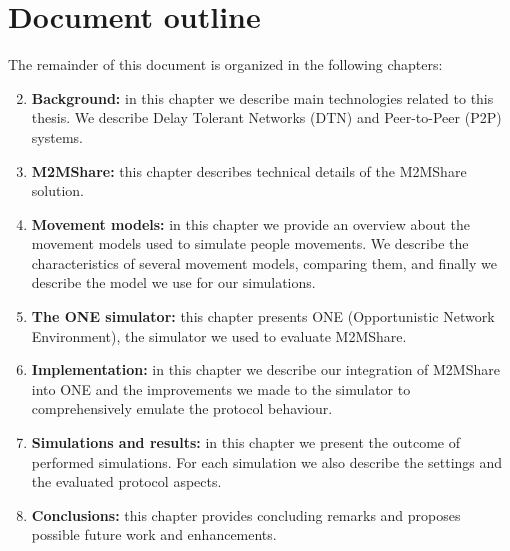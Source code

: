 \section{Document outline}
The remainder of this document is organized in the following chapters:
\begin{enumerate}
\setcounter{enumi}{1}
\item \textbf{Background:} in this chapter we describe main technologies related to this thesis. We describe Delay Tolerant Networks (DTN) and Peer-to-Peer (P2P) systems.
\item \textbf{M2MShare:} this chapter describes technical details of the M2MShare solution.
\item \textbf{Movement models:} in this chapter we provide an overview about the movement models used to simulate people movements. We describe the characteristics of several movement models, comparing them, and finally we describe the model we use for our simulations.
\item \textbf{The ONE simulator:} this chapter presents ONE (Opportunistic Network Environment), the simulator we used to evaluate M2MShare.
\item \textbf{Implementation:} in this chapter we describe our integration of M2MShare into ONE and the improvements we made to the simulator to comprehensively emulate the protocol behaviour.
\item \textbf{Simulations and results:} in this chapter we present the outcome of performed simulations. For each simulation we also describe the settings and the evaluated protocol aspects.
\item \textbf{Conclusions:}  this chapter provides concluding remarks and proposes possible future work and enhancements. %

\end{enumerate}
 

